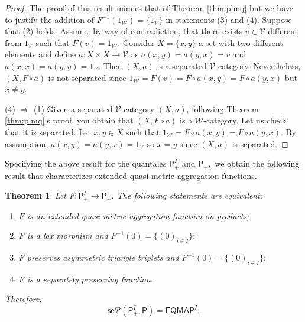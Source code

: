 \documentclass[11pt,a4paper]{amsart}
\newtheorem{theorem}{Theorem}[section]
\theoremstyle{definition}
\begin{document}
	\begin{proof}
		The proof of this result mimics that of Theorem \ref{thm:plmq} but we have to justify the addition of  $F^{-1}\left(1_{\mathscr{W}}\right)=\{1_{\mathscr{V}}\}$ in statements (3) and (4). Suppose that (2) holds. Assume, by way of contradiction, that there exists $v\in\mathscr{V}$ different from $1_\mathscr{V}$ such that $F(v)=1_\mathscr{W}.$ Consider $X=\{x,y\}$ a set with two different elements and define $a:X\times X\to\mathscr{V}$ as $a(x,y)=a(y,x)=v$ and $a(x,x)=a(y,y)=1_\mathscr{V}.$ Then $(X,a)$ is a separated $\mathscr{V}$-category. Nevertheless, $(X,F\circ a)$ is not separated since $1_\mathscr{W}=F(v)=F\circ a(x,y)=F\circ a(y,x)$ but $x\neq y.$ 
		
		(4) $\Rightarrow$ (1)  Given a separated $\mathscr{V}$-category $(X,a)$, following Theorem \ref{thm:plmq}'s proof, you obtain that $(X,F\circ a)$ is a $\mathscr{W}$-category. Let us check that it is separated. Let $x,y\in X$ such that $1_\mathscr{W}= F\circ a(x,y)=F\circ a(y,x).$ By assumption,  $a(x,y)=a(y,x)=1_\mathscr{V}$ so $x=y$ since $(X,a)$ is separated. 
	\end{proof}	
	
	Specifying the above result for the quantales $\mathsf{P}_+^I$ and $\mathsf{P}_+,$ we obtain the following result that characterizes extended quasi-metric aggregation functions. 
	
	\begin{theorem}\label{thm:eqmaf_spf}
		Let $F:\mathsf{P}_+^I\to\mathsf{P}_+.$ The following statements are equivalent:
		\begin{enumerate}[(1)]
			\item $F$ is an extended quasi-metric aggregation function on products;
			\item $F$ is a lax morphism and $F^{-1}(0)=\{(0)_{i\in I}\};$
			\item $F$ preserves asymmetric triangle triplets and $F^{-1}(0)=\{(0)_{i\in I}\};$
			\item $F$ is a separately preserving function.
		\end{enumerate}
		Therefore,
		$$\mathsf{se}\mathscr{P}(\mathsf{P}_+^I,\mathsf{P})=\mathsf{EQMAP}^I.$$
	\end{theorem}
	
\end{document}

